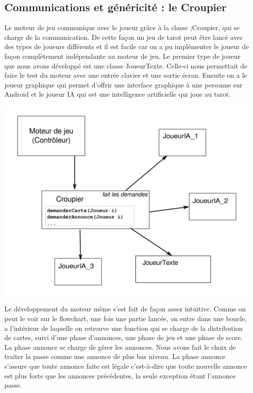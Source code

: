 \documentclass[a4paper]{report}
\begin{document}
		\subsection{Communications et généricité : le Croupier}
			Le moteur de jeu communique avec le joueur grâce à la classe ;Croupier, qui se charge de la communication. De cette façon un jeu de tarot peut être lancé avec des types de 				joueurs différents et il est facile car on a pu implémenter le joueur de façon complètement indépendante au moteur de jeu. Le premier type de joueur que nous avons développé 			est une classe JoueurTexte. Celle-ci nous permettait de faire le test du moteur avec une entrée clavier et une sortie écran.
			Ensuite on a le joueur graphique qui permet d'offrir une interface graphique à une personne sur Android et le joueur IA qui est une intelligence artificielle qui joue au tarot.
				\begin{center}
					\includegraphics[scale=0.7]{Images/croupier.png}
				\end{center}
			Le développement du moteur même s'est fait de façon assez intuitive. Comme on peut le voir sur le flowchart, une fois une partie lancée, on entre dans une boucle, a l'intérieur 				de laquelle on retrouve une fonction qui se charge de la distribution de cartes, suivi d'une phase d'annonces, une phase de jeu et une phase de score.
			La phase annonce se charge de gérer les annonces. Nous avons fait le choix de traiter la passe comme une annonce de plus bas niveau. La phase annonce s’assure que toute annonce 				faite est légale c'est-à-dire que toute nouvelle annonce est plus forte que les annonces précédentes, la seule exception étant l'annonce passe.
\end{document}
